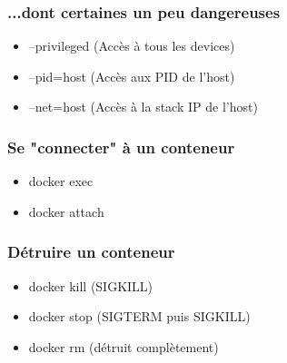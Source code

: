   \begin{frame}
    \frametitle{...dont certaines un peu dangereuses}
    \begin{itemize}
      \item --privileged (Accès à tous les devices)
      \item --pid=host (Accès aux PID de l'host)
      \item --net=host (Accès à la stack IP de l'host)
    \end{itemize}
  \end{frame}

  \begin{frame}
    \frametitle{Se "connecter" à un conteneur}
    \begin{itemize}
      \item docker exec
      \item docker attach
    \end{itemize}
  \end{frame}

  \begin{frame}
    \frametitle{Détruire un conteneur}
    \begin{itemize}
      \item docker kill (SIGKILL)
      \item docker stop (SIGTERM puis SIGKILL)
      \item docker rm (détruit complètement)
    \end{itemize}
  \end{frame}
